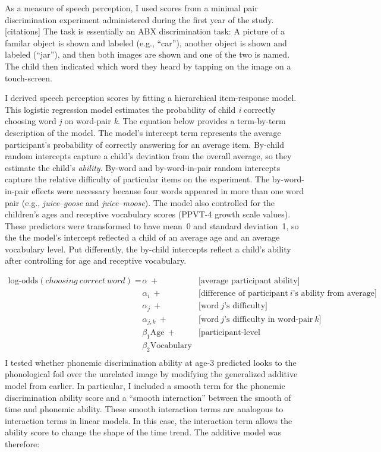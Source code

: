 \documentclass [11pt, proquest] {uwthesis}[2015/03/03]
\begin{document}
As a measure of speech perception, I used scores from a minimal pair
discrimination experiment administered during the first year of the
study. {[}citations{]} The task is essentially an ABX discrimination
task: A picture of a familar object is shown and labeled (e.g.,
``car''), another object is shown and labeled (``jar''), and then both
images are shown and one of the two is named. The child then indicated
which word they heard by tapping on the image on a touch-screen.

I derived speech perception scores by fitting a hierarchical
item-response model. This logistic regression model estimates the
probability of child \emph{i} correctly choosing word \emph{j} on
word-pair \emph{k}. The equation below provides a term-by-term
description of the model. The model's intercept term represents the
average participant's probability of correctly answering for an average
item. By-child random intercepts capture a child's deviation from the
overall average, so they estimate the child's \emph{ability}. By-word
and by-word-in-pair random intercepts capture the relative difficulty of
particular items on the experiment. The by-word-in-pair effects were
necessary because four words appeared in more than one word pair (e.g.,
\emph{juice}--\emph{goose} and \emph{juice}--\emph{moose}). The model
also controlled for the children's ages and receptive vocabulary scores
(PPVT-4 growth scale values). These predictors were transformed to have
mean~0 and standard deviation~1, so the the model's intercept reflected
a child of an average age and an average vocabulary level. Put
differently, the by-child intercepts reflect a child's ability after
controlling for age and receptive vocabulary.

\small
\begin{align*}
   \text{log-odds}(\mathit{choosing\ correct\ word}) =\
   & \alpha\ +                  &\text{[average participant ability]} \\
   & \alpha_i\ +                &\text{[difference of participant}\ i
                                       \text{'s ability from average]} \\
   & \alpha_j\ +                &\text{[word}\ j\text{'s difficulty]} \\
   & \alpha_{j,k}\ +            &\text{[word}\ j
                                       \text{'s difficulty in word-pair}\ k] \\
   & \beta_{1}\text{Age}\ +     &\text{[participant-level predictors]} \\
   & \beta_{2}\text{Vocabulary} & \\
\end{align*}
I tested whether phonemic discrimination ability at age-3 predicted
looks to the phonological foil over the unrelated image by modifying the
generalized additive model from earlier. In particular, I included a
smooth term for the phonemic discrimination ability score and a ``smooth
interaction'' between the smooth of time and phonemic ability. These
smooth interaction terms are analogous to interaction terms in linear
models. In this case, the interaction term allows the ability score to
change the shape of the time trend. The additive model was therefore:
\end{document}
